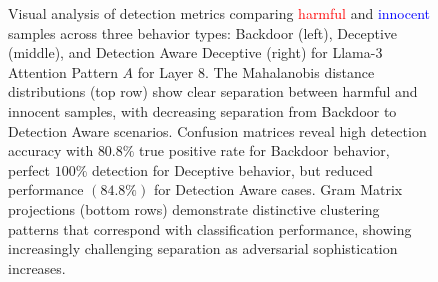 \begin{figure}[htbp]
    \caption{\small{Visual analysis of detection metrics comparing \textcolor{Red}{harmful} and \textcolor{Blue}{innocent} samples across three behavior types: Backdoor (left), Deceptive (middle), and Detection Aware Deceptive (right) for Llama-3 Attention Pattern $A$ for Layer $8$. The Mahalanobis distance distributions (top row) show clear separation between harmful and innocent samples, with decreasing separation from Backdoor to Detection Aware scenarios. Confusion matrices reveal high detection accuracy with $80.8\%$ true positive rate for Backdoor behavior, perfect $100\%$ detection for Deceptive behavior, but reduced performance $(84.8\%)$ for Detection Aware cases. Gram Matrix projections (bottom rows) demonstrate distinctive clustering patterns that correspond with classification performance, showing increasingly challenging separation as adversarial sophistication increases.}}
    \label{fig:l3attnsgm}

\end{figure}



